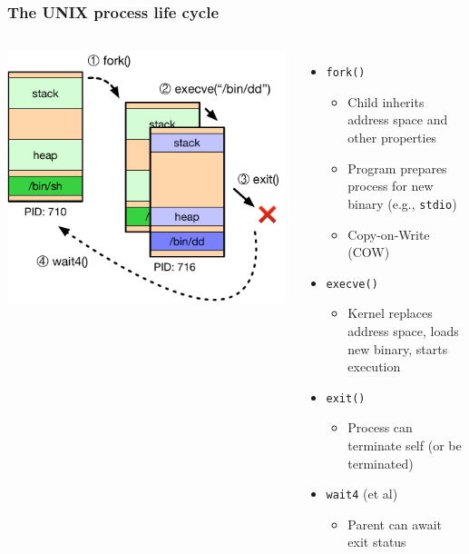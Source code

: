 \documentclass[pdftex]{beamer}
\begin{document}
\begin{frame}[fragile]
  \frametitle{The UNIX process life cycle}

  \begin{columns}[T]
      \vspace{0.5cm}
      \includegraphics[width=\textwidth]{../figures/process-life-cycle.pdf}

    \begin{itemize}
      \item \texttt{fork()}
      \begin{itemize}
	\item Child inherits address space and other properties
	\item Program prepares process for new binary (e.g., \texttt{stdio})
	\item Copy-on-Write (COW)
      \end{itemize}
      \pause
      \item \texttt{execve()}
      \begin{itemize}
	\item Kernel replaces address space, loads new binary, starts execution
      \end{itemize}
      \pause
      \item \texttt{exit()}
      \begin{itemize}
	\item Process can terminate self (or be terminated)
      \end{itemize}
      \pause
      \item \texttt{wait4} (et al)
      \begin{itemize}
	\item Parent can await exit status
      \end{itemize}
    \end{itemize}
  \end{columns}
\end{frame}
\end{document}

